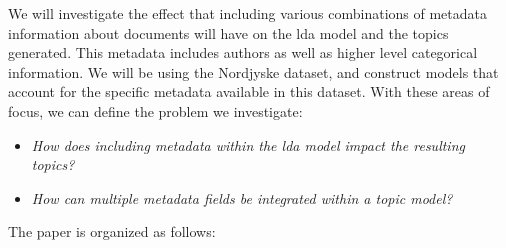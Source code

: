 We will investigate the effect that including various combinations of metadata information about documents will have on the \gls{lda} model and the topics generated.
This metadata includes authors as well as higher level categorical information.
We will be using the Nordjyske dataset, and construct models that account for the specific metadata available in this dataset.
With these areas of focus, we can define the problem we investigate:

\begin{itemize}
	\item \textit{How does including metadata within the \gls{lda} model impact the resulting topics?}
	\item \textit{How can multiple metadata fields be integrated within a topic model?}
\end{itemize}

The paper is organized as follows: 

